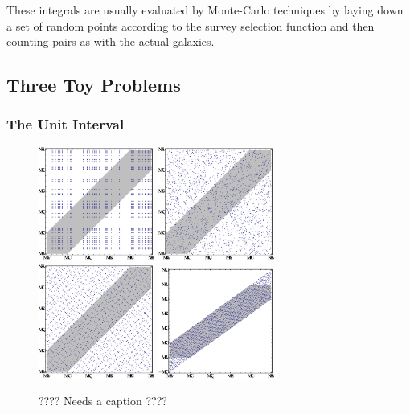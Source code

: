 \documentclass[usenatbib]{mn2e}
\begin{document}
These integrals are usually evaluated by Monte-Carlo techniques by laying down a
set of random points according to the survey selection function and then
counting pairs as with the actual galaxies. 

\subsection{Three Toy Problems}

\subsubsection{The Unit Interval}

\begin{figure}
\includegraphics[width=1.5in]{plots/grid1d-1}
\includegraphics[width=1.5in]{plots/grid1d-2}
\includegraphics[width=1.5in]{plots/grid1d-3}
\includegraphics[width=1.5in]{plots/grid1d-4}
\caption{???? Needs a caption ????}
\label{fig:grid1d}
\end{figure}
\end{document}
